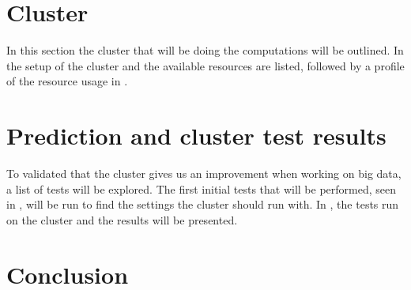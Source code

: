 \documentclass[columns=,boxcolor=white]{datart}
\begin{document}
\section{Cluster}\label{sec:cluster}
In this section the cluster that will be doing the computations will be outlined. In  the setup of the cluster and the available resources are listed, followed by a profile of the resource usage in .






\section{Prediction and cluster test results}\label{sec:testing}
To validated that the cluster gives us an improvement when working on big data, a list of tests will be explored. The first initial tests that will be performed, seen in , will be run to find the settings the cluster should run with. In , the tests run on the cluster and the results will be presented.






\section{Conclusion}





\newpage
\appendix

%
%
\end{document}
